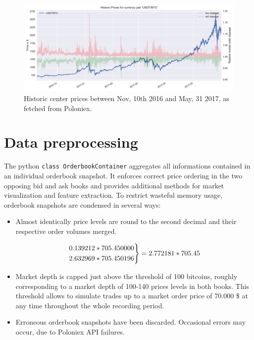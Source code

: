 \begin{figure}[ht]
	\centering
   \includegraphics[width=1.\textwidth]{content/drawings/bitcoin_historicPrices}
	\caption{Historic center prices between Nov, 10th 2016 and May, 31 2017, as fetched from Poloniex.}
	\label{fig:ploniexPriceHistory}
\end{figure}

\section{Data preprocessing}
\label{chap:preprocessing}
The python \lstinline!class OrderbookContainer! aggregates all informations contained in an individual orderbook snapshot. It enforces correct price ordering in the two opposing bid and ask books and provides additional methods for market visualization and feature extraction. To restrict wasteful memory usage, orderbook snapshots are condensed in several ways:

\begin{itemize}
\item Almost identically price levels are round to the second decimal and their respective order volumes merged.

 \[ 
  \begin{rcases}
    0.139212 * 705.450000\\
    2.632969 * 705.450196\\
  \end{rcases} 
  = 2.772181 * 705.45
\]
\item Market depth is capped just above the threshold of 100 bitcoins, roughly corresponding to a market depth of 100-140 prices levels in both books. This threshold allows to simulate trades up to a market order price of 70.000 \$ at any time throughout the whole recording period.

\item Erroneous orderbook snapshots have been discarded. Occasional errors may occur, due to Poloniex API failures.

\end{itemize}

